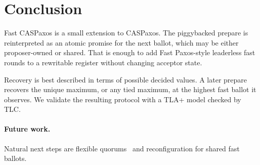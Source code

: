 \section{Conclusion}
\label{sec:summary}

Fast CASPaxos is a small extension to CASPaxos.
The piggybacked prepare is reinterpreted as an atomic promise for the next ballot, which may be either proposer-owned or shared.
That is enough to add Fast Paxos-style leaderless fast rounds to a rewritable register without changing acceptor state.

Recovery is best described in terms of possible decided values.
A later prepare recovers the unique maximum, or any tied maximum, at the highest fast ballot it observes.
We validate the resulting protocol with a TLA+ model checked by TLC.

\paragraph{Future work.}
Natural next steps are flexible quorums~\cite{howard_icdcn21} and reconfiguration for shared fast ballots.
